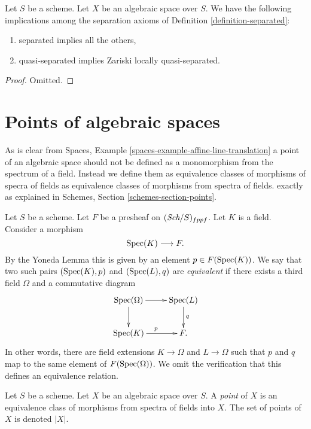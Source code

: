 \begin{lemma}
\label{lemma-trivial-implications}
Let $S$ be a scheme.
Let $X$ be an algebraic space over $S$.
We have the following implications among the separation axioms
of Definition \ref{definition-separated}:
\begin{enumerate}
\item separated implies all the others,
\item quasi-separated implies Zariski locally quasi-separated.
\end{enumerate}
\end{lemma}

\begin{proof}
Omitted.
\end{proof}











\section{Points of algebraic spaces}
\label{section-points}

\noindent
As is clear from
Spaces, Example \ref{spaces-example-affine-line-translation}
a point of an algebraic space should not be defined as a monomorphism
from the spectrum of a field.
Instead we define them as equivalence classes of morphisms of specra
of fields as equivalence classes of morphisms from spectra of fields.
exactly as explained in
Schemes, Section \ref{schemes-section-points}.

\medskip\noindent
Let $S$ be a scheme.
Let $F$ be a presheaf on $(\textit{Sch}/S)_{fppf}$.
Let $K$ is a field. Consider a morphism
$$
\mathop{\rm Spec}(K) \longrightarrow F.
$$
By the Yoneda Lemma this is given by an
element $p \in F(\mathop{\rm Spec}(K))$. We say that two such
pairs $(\mathop{\rm Spec}(K), p)$ and $(\mathop{\rm Spec}(L), q)$
are {\it equivalent} if there exists
a third field $\Omega$ and a commutative diagram
$$
\xymatrix{
\Spec(\Omega) \ar[r] \ar[d] &
\Spec(L) \ar[d]^q \\
\Spec(K) \ar[r]^p &
F.
}
$$
In other words, there are field extensions
$K \to \Omega$ and $L \to \Omega$ such that
$p$ and $q$ map to the same element
of $F(\mathop{\rm Spec}(\Omega))$. We omit the verification that this
defines an equivalence relation.

\begin{definition}
\label{definition-points}
Let $S$ be a scheme. Let $X$ be an algebraic space over $S$.
A {\it point} of $X$ is an equivalence class of morphisms
from spectra of fields into $X$.
The set of points of $X$ is denoted $|X|$.
\end{definition}

